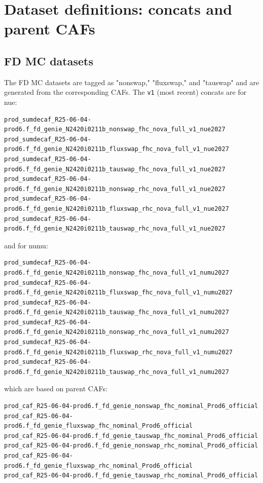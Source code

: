 \documentclass{article}
\begin{document}

\section{Dataset definitions: concats and parent CAFs}

\subsection{FD MC datasets}
The FD MC datasets are tagged as "nonswap," "fluxswap," and "tauswap" and are generated from the corresponding CAFs.
The \texttt{v1} (most recent) concats are for nue:
{\smaller\begin{verbatim}
prod_sumdecaf_R25-06-04-prod6.f_fd_genie_N2420i0211b_nonswap_fhc_nova_full_v1_nue2027
prod_sumdecaf_R25-06-04-prod6.f_fd_genie_N2420i0211b_fluxswap_fhc_nova_full_v1_nue2027
prod_sumdecaf_R25-06-04-prod6.f_fd_genie_N2420i0211b_tauswap_fhc_nova_full_v1_nue2027
prod_sumdecaf_R25-06-04-prod6.f_fd_genie_N2420i0211b_nonswap_rhc_nova_full_v1_nue2027
prod_sumdecaf_R25-06-04-prod6.f_fd_genie_N2420i0211b_fluxswap_rhc_nova_full_v1_nue2027
prod_sumdecaf_R25-06-04-prod6.f_fd_genie_N2420i0211b_tauswap_rhc_nova_full_v1_nue2027
\end{verbatim}}
and for numu:
{\smaller\begin{verbatim}
prod_sumdecaf_R25-06-04-prod6.f_fd_genie_N2420i0211b_nonswap_fhc_nova_full_v1_numu2027
prod_sumdecaf_R25-06-04-prod6.f_fd_genie_N2420i0211b_fluxswap_fhc_nova_full_v1_numu2027
prod_sumdecaf_R25-06-04-prod6.f_fd_genie_N2420i0211b_tauswap_fhc_nova_full_v1_numu2027
prod_sumdecaf_R25-06-04-prod6.f_fd_genie_N2420i0211b_nonswap_rhc_nova_full_v1_numu2027
prod_sumdecaf_R25-06-04-prod6.f_fd_genie_N2420i0211b_fluxswap_rhc_nova_full_v1_numu2027
prod_sumdecaf_R25-06-04-prod6.f_fd_genie_N2420i0211b_tauswap_rhc_nova_full_v1_numu2027
\end{verbatim}}
which are based on parent CAFs:
{\smaller\begin{verbatim}
prod_caf_R25-06-04-prod6.f_fd_genie_nonswap_fhc_nominal_Prod6_official
prod_caf_R25-06-04-prod6.f_fd_genie_fluxswap_fhc_nominal_Prod6_official
prod_caf_R25-06-04-prod6.f_fd_genie_tauswap_fhc_nominal_Prod6_official
prod_caf_R25-06-04-prod6.f_fd_genie_nonswap_rhc_nominal_Prod6_official
prod_caf_R25-06-04-prod6.f_fd_genie_fluxswap_rhc_nominal_Prod6_official
prod_caf_R25-06-04-prod6.f_fd_genie_tauswap_rhc_nominal_Prod6_official
\end{verbatim}}
\end{document}
